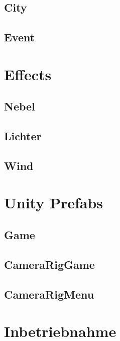 \subsection{City}\label{subsec:day-night-background-sound}
\subsection{Event}\label{subsec:building-collapse-sound}
\section{Effects}\label{sec:effects}
\subsection{Nebel}\label{subsec:fog-effect}
\subsection{Lichter}\label{subsec:light-effect}
\subsection{Wind}\label{subsec:wind-effect}
\section{Unity Prefabs}\label{sec:prefabs}
\subsection{Game}\label{subsec:game-prefab}
\subsection{CameraRigGame}\label{subsec:camera-rig-game-prefab}
\subsection{CameraRigMenu}\label{subsec:camera-rig-menu-prefab}
\section{Inbetriebnahme}\label{sec:commissioning}
